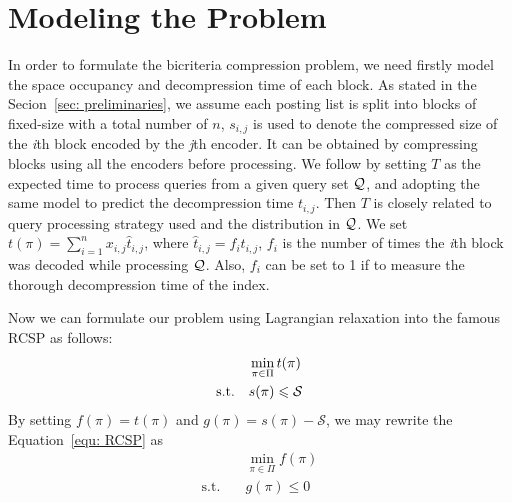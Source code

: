 \documentclass{sig-alternate-05-2015}
\begin{document}

\section{Modeling the Problem}\label{sec: model}
In order to formulate the bicriteria compression problem, we need firstly model the space occupancy and decompression time of each block.
As stated in the Secion~\ref{sec: preliminaries}, we assume each posting list is split into blocks of fixed-size with a total number of $ n $, $ s_{i,j} $ is used to denote the compressed size of the \textit{i}th block encoded by the \textit{j}th encoder.
It can be obtained by compressing blocks using all the encoders before processing.
We follow \cite{ottaviano2015optimal} by setting $ T $ as the expected time to process queries from a given query set $ \cal Q $, and adopting the same model to predict the decompression time $ t_{i,j} $.
Then $ T $ is closely related to query processing strategy used and the distribution in $ \cal Q $.
We set $ t(\pi) = \sum_{i=1}^{n}x_{i,j}\hat{t}_{i,j} $, where $ \hat{t}_{i,j}=f_i t_{i,j} $, $ f_i $ is the number of times the \textit{i}th block was decoded while processing $ \cal Q $.
Also, $ f_i $ can be set to 1 if to measure the thorough decompression time of the index.

Now we can formulate our problem using Lagrangian relaxation into the famous RCSP as follows:
\begin{align}
 & \min_{\pi \in \Pi} t(\pi) \notag \\
 \text{s.t.}\quad & s(\pi) \leqslant \cal S \label{equ: RCSP}
\end{align}
By setting $ f(\pi) = t(\pi) $ and $ g(\pi) = s(\pi)- \mathcal{S} $, we may rewrite the Equation~\eqref{equ: RCSP} as
\begin{align*}
& \min_{\pi \in \Pi} f(\pi) \\
\text{s.t.}\quad & g(\pi) \leqslant 0
\end{align*}
\end{document}

